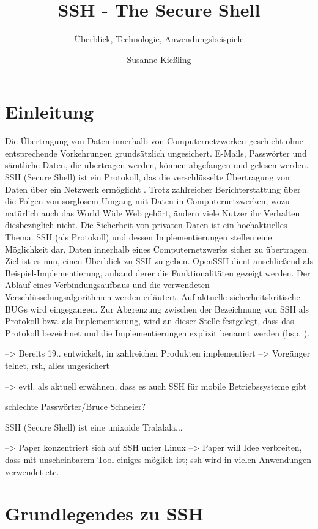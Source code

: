 \documentclass[ngerman,pdf]{wkcms}    %
\title{SSH - The Secure Shell}
\subtitle{Überblick, Technologie, Anwendungsbeispiele}
\author{Susanne Kießling}
\date{\todaylong}
\begin{document}
\maketitle


\section{Einleitung}

Die Übertragung von Daten innerhalb von Computernetzwerken geschieht ohne
entsprechende Vorkehrungen grundsätzlich ungesichert. E-Mails, Passwörter und sämtliche Daten, die übertragen werden, können abgefangen und gelesen werden. SSH (Secure Shell) ist ein Protokoll, das die verschlüsselte Übertragung von Daten über ein Netzwerk ermöglicht \cite{SSH}.
Trotz zahlreicher Berichterstattung über die Folgen von sorglosem Umgang mit Daten in Computernetzwerken, wozu natürlich auch das World Wide Web gehört, ändern viele Nutzer
ihr Verhalten diesbezüglich nicht. Die Sicherheit von privaten Daten ist ein hochaktuelles Thema. SSH (als Protokoll) und dessen Implementierungen stellen eine Möglichkeit dar, Daten innerhalb eines Computernetzwerks sicher zu übertragen. Ziel ist es nun, einen Überblick zu SSH zu geben. OpenSSH dient anschließend als Beispiel-Implementierung, anhand derer die Funktionalitäten gezeigt werden. Der Ablauf eines Verbindungsaufbaus und die verwendeten Verschlüsselungsalgorithmen werden erläutert. Auf aktuelle sicherheitskritische BUGs wird eingegangen. Zur Abgrenzung zwischen der Bezeichnung von SSH als Protokoll bzw. als Implementierung, wird an dieser Stelle festgelegt, dass  das Protokoll bezeichnet und die Implementierungen explizit benannt werden (bsp. ).

--> Bereits 19.. entwickelt, in zahlreichen Produkten implementiert
--> Vorgänger telnet, rsh, alles ungesichert

--> evtl. als aktuell erwähnen, dass es auch SSH für mobile Betriebssysteme gibt

 schlechte Passwörter/Bruce Schneier?

SSH (Secure Shell) ist eine unixoide Tralalala...

--> Paper konzentriert sich auf SSH unter Linux
--> Paper will Idee verbreiten, dass mit unscheinbarem Tool einiges möglich ist; ssh wird in vielen Anwendungen verwendet etc.



\newpage

\section{Grundlegendes zu SSH}
\end{document}
